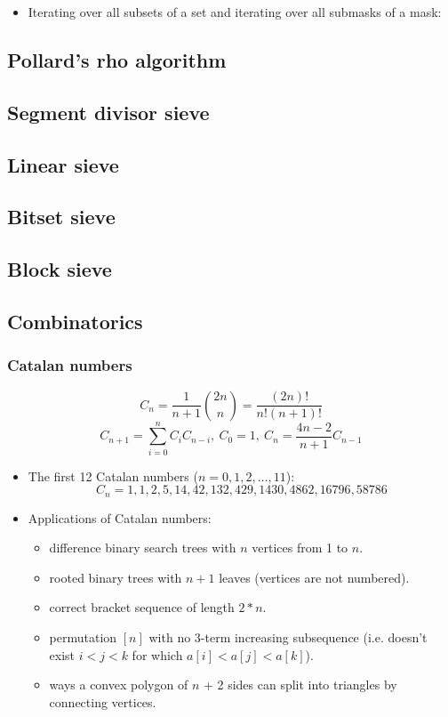 \begin{itemize}
  \item Iterating over all subsets of a set and iterating over all submasks of a mask:
\end{itemize}

\subsection{Pollard's rho algorithm}

\subsection{Segment divisor sieve}

\subsection{Linear sieve}

\subsection{Bitset sieve}

\subsection{Block sieve}

\subsection{Combinatorics}
\subsubsection{Catalan numbers}
\[ C_n = \frac{1}{n + 1} {2n \choose n} = \frac{(2n)!}{n!(n+1)!}\]
\[ C_{n + 1} = \displaystyle\sum_{i = 0}^{n}C_i C_{n - i},\ C_0 = 1,\ C_n = \frac{4n - 2}{n + 1}C_{n - 1}\]
\begin{itemize}
  \item The first 12 Catalan numbers ($n = 0, 1, 2, \ldots, 11$):
  \[ C_n = 1, 1, 2, 5, 14, 42, 132, 429, 1430, 4862, 16796, 58786 \]
  \item Applications of Catalan numbers:
  \begin{itemize}
    \item difference binary search trees with $n$ vertices from 1 to $n$.
    \item rooted binary trees with $n + 1$ leaves (vertices are not numbered).
    \item correct bracket sequence of length $2 * n$.
    \item permutation $[n]$ with no 3-term increasing subsequence (i.e. doesn't exist $i < j < k$ for which $a[i] < a[j] < a[k]$).
    \item ways a convex polygon of $n$ + 2 sides can split into triangles by connecting vertices.
  \end{itemize}
\end{itemize}

